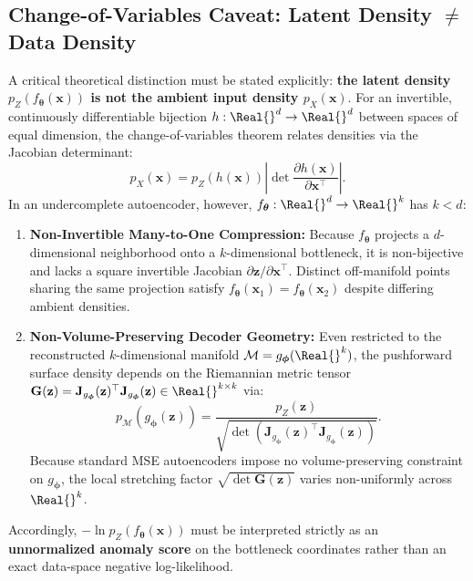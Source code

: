 \subsection{Change-of-Variables Caveat: Latent Density $\neq$ Data Density}
\label{sec:p2_change_of_variables}
A critical theoretical distinction must be stated explicitly: \textbf{the latent density $p_Z(f_{\boldsymbol{\theta}}(\mathbf{x}))$ is not the ambient input density $p_X(\mathbf{x})$}.
For an invertible, continuously differentiable bijection $h: \Real{}^d \to \Real{}^d$ between spaces of equal dimension, the change-of-variables theorem \cite{rezende2015variational} relates densities via the Jacobian determinant:
\begin{equation}
    p_X(\mathbf{x}) = p_Z(h(\mathbf{x})) \left| \det \frac{\partial h(\mathbf{x})}{\partial \mathbf{x}^\top} \right|.
    \label{eq:cov_bijection}
\end{equation}
In an undercomplete autoencoder, however, $f_{\boldsymbol{\theta}}: \Real{}^d \to \Real{}^k$ has $k < d$:
\begin{enumerate}
    \item \textbf{Non-Invertible Many-to-One Compression:} Because $f_{\boldsymbol{\theta}}$ projects a $d$-dimensional neighborhood onto a $k$-dimensional bottleneck, it is non-bijective and lacks a square invertible Jacobian $\partial \mathbf{z}/\partial \mathbf{x}^\top$. Distinct off-manifold points sharing the same projection satisfy $f_{\boldsymbol{\theta}}(\mathbf{x}_1) = f_{\boldsymbol{\theta}}(\mathbf{x}_2)$ despite differing ambient densities.
    \item \textbf{Non-Volume-Preserving Decoder Geometry:} Even restricted to the reconstructed $k$-dimensional manifold $\mathcal{M} = g_{\boldsymbol{\phi}}(\Real{}^k)$, the pushforward surface density depends on the Riemannian metric tensor $\mathbf{G}(\mathbf{z}) = \mathbf{J}_{g_{\boldsymbol{\phi}}}(\mathbf{z})^\top \mathbf{J}_{g_{\boldsymbol{\phi}}}(\mathbf{z}) \in \Real{}^{k \times k}$ via:
    \begin{equation}
        p_{\mathcal{M}}(g_{\boldsymbol{\phi}}(\mathbf{z})) = \frac{p_Z(\mathbf{z})}{\sqrt{\det\!\left(\mathbf{J}_{g_{\boldsymbol{\phi}}}(\mathbf{z})^\top \mathbf{J}_{g_{\boldsymbol{\phi}}}(\mathbf{z})\right)}}.
        \label{eq:riemannian_volume}
    \end{equation}
    Because standard MSE autoencoders impose no volume-preserving constraint on $g_{\boldsymbol{\phi}}$, the local stretching factor $\sqrt{\det \mathbf{G}(\mathbf{z})}$ varies non-uniformly across $\Real{}^k$.
\end{enumerate}
Accordingly, $-\ln p_Z(f_{\boldsymbol{\theta}}(\mathbf{x}))$ must be interpreted strictly as an \textbf{unnormalized anomaly score} on the bottleneck coordinates rather than an exact data-space negative log-likelihood.

